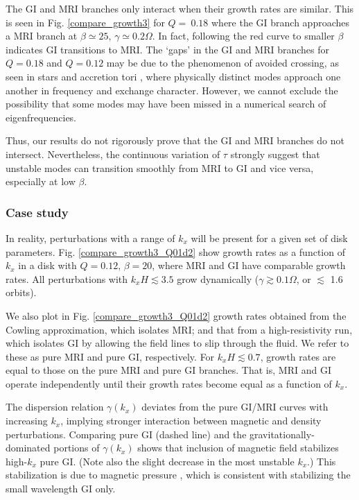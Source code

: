 The GI and MRI branches only interact when their growth rates
are similar. This is seen in Fig. \ref{compare_growth3} for $Q=~0.18$
where the GI branch approaches a MRI branch at $\beta\simeq 25,\,
\gamma\simeq 0.2\Omega$. In fact, following the red curve to smaller
$\beta$ indicates GI transitions to MRI. The
`gaps' in the GI and MRI branches for $Q=0.18$ and $Q=0.12$ may be due
to the phenomenon of avoided crossing, as seen in stars
\citep[e.g.][]{aizenman77} and accretion tori
\citep[e.g.][]{christo93}, where physically distinct modes approach
one another in frequency and exchange character. However, we cannot
exclude the possibility  that some modes may have been missed in a 
numerical search of eigenfrequencies.  

Thus, our results do not rigorously prove that the GI and MRI branches
do not intersect.  Nevertheless, the continuous variation of $\tau$
strongly suggest that unstable modes can transition smoothly from 
MRI to GI and vice versa, especially at low $\beta$.     

\subsubsection{Case study} 
In reality, perturbations with a range of $k_x$ will be present for a
given set of disk parameters. Fig. \ref{compare_growth3_Q01d2} show
growth rates as a function of $k_x$ in a disk with
$Q=0.12,\,\beta=20$, where MRI and GI have comparable growth
rates. All perturbations with $k_xH \lesssim 3.5$ grow dynamically
($\gamma\gtrsim 0.1\Omega$, or $\lesssim$ 1.6 orbits).

We also plot in Fig. \ref{compare_growth3_Q01d2} growth rates obtained 
from the Cowling approximation, which isolates MRI; and that from a
high-resistivity run, which isolates GI by allowing the field lines to
slip through the fluid. We refer to these as  
pure MRI and pure GI, respectively.  
For $k_xH\lesssim 0.7$, growth rates are equal to
those on the pure MRI and pure GI branches. That is, MRI and GI
operate independently until their growth rates become equal as a
function of $k_x$.  

The dispersion relation $\gamma(k_x)$ deviates from the
pure GI/MRI curves with increasing $k_x$, implying stronger interaction between
magnetic and density perturbations. Comparing pure GI (dashed line)
and the gravitationally-dominated portions of $\gamma(k_x)$ shows that 
inclusion of magnetic field stabilizes high-$k_x$ pure GI. (Note also
the slight decrease in the most unstable $k_x$.) 
This stabilization is due to magnetic pressure \citep{lizano10}, which
is consistent with stabilizing the small wavelength GI only.    

